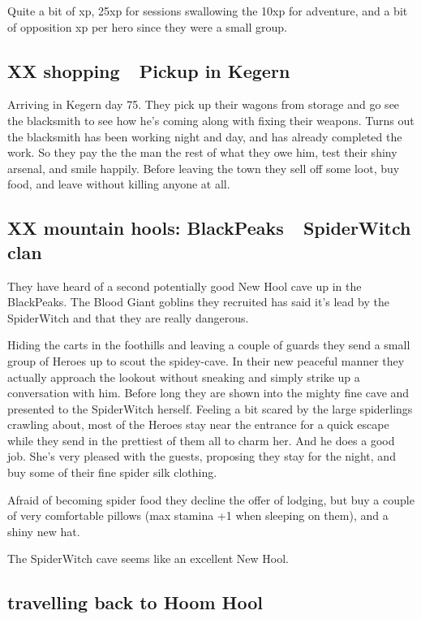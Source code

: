 Quite a bit of xp, 25xp for sessions swallowing the 10xp for adventure, and a bit of opposition xp per hero since they were a small group.


\subsection*{XX shopping~\mdash~Pickup in Kegern}

Arriving in Kegern day 75. They pick up their wagons from storage and go see the blacksmith to see how he's coming along with fixing their weapons. Turns out the blacksmith has been working night and day, and has already completed the work. So they pay the the man the rest of what they owe him, test their shiny arsenal, and smile happily. Before leaving the town they sell off some loot, buy food, and leave without killing anyone at all.


\subsection*{XX mountain hools: BlackPeaks~\dash~SpiderWitch clan}

They have heard of a second potentially good New Hool cave up in the BlackPeaks. The Blood Giant goblins they recruited has said it's lead by the SpiderWitch and that they are really dangerous.

Hiding the carts in the foothills and leaving a couple of guards they send a small group of Heroes up to scout the spidey-cave. In their new peaceful manner they actually approach the lookout without sneaking and simply strike up a conversation with him. Before long they are shown into the mighty fine cave and presented to the SpiderWitch herself. Feeling a bit scared by the large spiderlings crawling about, most of the Heroes stay near the entrance for a quick escape while they send in the prettiest of them all to charm her. And he does a good job. She's very pleased with the guests, proposing they stay for the night, and buy some of their fine spider silk clothing.

Afraid of becoming spider food they decline the offer of lodging, but buy a couple of very comfortable pillows (max stamina +1 when sleeping on them), and a shiny new hat.

The SpiderWitch cave seems like an excellent New Hool.


\subsection*{travelling back to Hoom Hool}

